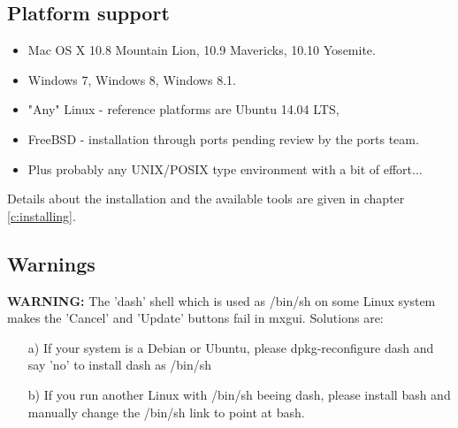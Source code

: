 \subsection{Platform support}
\begin{itemize}
\item Mac OS X 10.8 Mountain Lion, 10.9 Mavericks, 10.10 Yosemite.
\item Windows 7, Windows 8, Windows 8.1.
\item "Any" Linux - reference platforms are Ubuntu 14.04 LTS, 
\item FreeBSD - installation through ports pending review by the ports team.
\item Plus probably any UNIX/POSIX type environment with a bit of effort...
\end{itemize}
Details about the installation and the available tools are given in chapter \ref{c:installing}.

\subsection{Warnings}
{\bfseries WARNING:} The 'dash' shell which is used as /bin/sh on some Linux system makes the 'Cancel' and 'Update' 
buttons fail in mxgui. Solutions are:
\begin{itemize}
  \item[a)] If your system is a Debian or Ubuntu, please dpkg-reconfigure dash and say 'no' to install dash as /bin/sh
  \item[b)] If you run another Linux with /bin/sh beeing dash, please install bash and manually change the /bin/sh link to point at bash.
\end{itemize}

